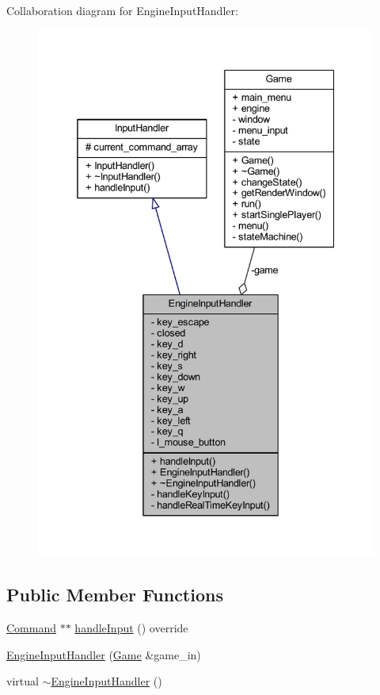 Collaboration diagram for Engine\+Input\+Handler\+:
\nopagebreak
\begin{figure}[H]
\begin{center}
\leavevmode
\includegraphics[width=338pt]{class_engine_input_handler__coll__graph}
\end{center}
\end{figure}
\subsection*{Public Member Functions}
\begin{DoxyCompactItemize}
\item 
\hyperlink{class_command}{Command} $\ast$$\ast$ \hyperlink{class_engine_input_handler_ade92afaf7657007c2be3b5bd745c96e3}{handle\+Input} () override
\item 
\hyperlink{class_engine_input_handler_ac33be38a17d38deb390b879ceb2e1e2f}{Engine\+Input\+Handler} (\hyperlink{class_game}{Game} \&game\+\_\+in)
\item 
virtual \hyperlink{class_engine_input_handler_a92a875197705110bd6b2debfe7dbee6a}{$\sim$\+Engine\+Input\+Handler} ()
\end{DoxyCompactItemize}
